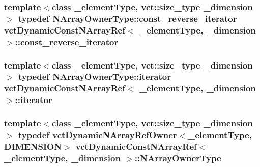 \hypertarget{classvct_dynamic_const_n_array_ref_ac774d4a8e4c0f0a5caeab26c96531d96}{
\subsubsection[{const\-\_\-reverse\-\_\-iterator}]{\setlength{\rightskip}{0pt plus 5cm}template$<$class \-\_\-element\-Type, vct\-::size\-\_\-type \-\_\-dimension$>$ typedef {\bf N\-Array\-Owner\-Type\-::const\-\_\-reverse\-\_\-iterator} {\bf vct\-Dynamic\-Const\-N\-Array\-Ref}$<$ \-\_\-element\-Type, \-\_\-dimension $>$\-::{\bf const\-\_\-reverse\-\_\-iterator}}}\label{classvct_dynamic_const_n_array_ref_ac774d4a8e4c0f0a5caeab26c96531d96}
\hypertarget{classvct_dynamic_const_n_array_ref_a29ec06cf468998d878719954c10bc973}{
\subsubsection[{iterator}]{\setlength{\rightskip}{0pt plus 5cm}template$<$class \-\_\-element\-Type, vct\-::size\-\_\-type \-\_\-dimension$>$ typedef {\bf N\-Array\-Owner\-Type\-::iterator} {\bf vct\-Dynamic\-Const\-N\-Array\-Ref}$<$ \-\_\-element\-Type, \-\_\-dimension $>$\-::{\bf iterator}}}\label{classvct_dynamic_const_n_array_ref_a29ec06cf468998d878719954c10bc973}
\hypertarget{classvct_dynamic_const_n_array_ref_a0dc3cb1f3a96c6cf28da6084c4072151}{
\subsubsection[{N\-Array\-Owner\-Type}]{\setlength{\rightskip}{0pt plus 5cm}template$<$class \-\_\-element\-Type, vct\-::size\-\_\-type \-\_\-dimension$>$ typedef {\bf vct\-Dynamic\-N\-Array\-Ref\-Owner}$<$\-\_\-element\-Type, {\bf D\-I\-M\-E\-N\-S\-I\-O\-N}$>$ {\bf vct\-Dynamic\-Const\-N\-Array\-Ref}$<$ \-\_\-element\-Type, \-\_\-dimension $>$\-::{\bf N\-Array\-Owner\-Type}}}\label{classvct_dynamic_const_n_array_ref_a0dc3cb1f3a96c6cf28da6084c4072151}
